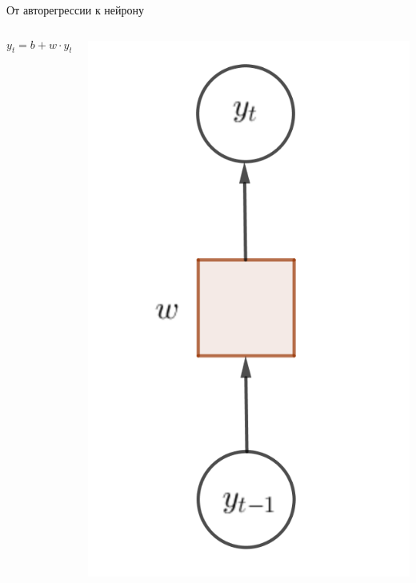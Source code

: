 \documentclass[notes,12pt, aspectratio=169]{beamer}
\begin{document}
\begin{frame}{От авторегрессии к нейрону}
\begin{columns}	
	\begin{column}{.68\linewidth}
		\begin{equation*} 
		y_t = b + w \cdot y_{t-1} 
		\end{equation*} 
	\end{column}
	\begin{column}{.28\linewidth}
	\begin{center}
		\includegraphics[width=.9\linewidth]{rec_neuron_1.png}
	\end{center}
\end{column}
\end{columns}
\end{frame}
\end{document}
